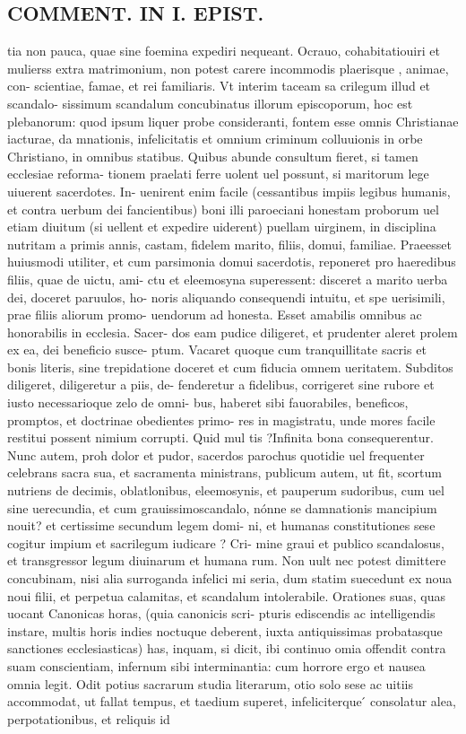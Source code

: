 \documentclass{article}
\begin{document}
\begin{pages}
\section*{COMMENT. IN I. EPIST. }
\marginpar{[ p.492 ]}\pstart tia non pauca, quae sine foemina expediri nequeant. Ocrauo, cohabitatiouiri et mulierss extra matrimonium, non potest carere incommodis plaerisque , animae, con- scientiae, famae, et rei familiaris. Vt interim taceam sa crilegum illud et scandalo- sissimum scandalum concubinatus illorum episcoporum, hoc est plebanorum: quod ipsum liquer probe consideranti, fontem esse omnis Christianae iacturae, da mnationis, infelicitatis et omnium criminum colluuionis in orbe Christiano, in omnibus statibus. Quibus abunde consultum fieret, si tamen ecclesiae reforma- tionem praelati ferre uolent uel possunt, si maritorum lege uiuerent sacerdotes. In- uenirent enim facile (cessantibus impiis legibus humanis, et contra uerbum dei fancientibus) boni illi paroeciani honestam proborum uel etiam diuitum (si uellent et expedire uiderent) puellam uirginem, in disciplina nutritam a primis annis, castam, fidelem marito, filiis, domui, familiae. Praeesset huiusmodi utiliter, et cum parsimonia domui sacerdotis, reponeret pro haeredibus filiis, quae de uictu, ami- ctu et eleemosyna superessent: disceret a marito uerba dei, doceret paruulos, ho- noris aliquando consequendi intuitu, et spe uerisimili, prae filiis aliorum promo- uendorum ad honesta. Esset amabilis omnibus ac honorabilis in ecclesia. Sacer- dos eam pudice diligeret, et prudenter aleret prolem ex ea, dei beneficio susce- ptum. Vacaret quoque cum tranquillitate sacris et bonis literis, sine trepidatione doceret et cum fiducia omnem ueritatem. Subditos diligeret, diligeretur a piis, de- fenderetur a fidelibus, corrigeret sine rubore et iusto necessarioque zelo de omni- bus, haberet sibi fauorabiles, beneficos, promptos, et doctrinae obedientes primo- res in magistratu, unde mores facile restitui possent nimium corrupti. Quid mul tis ?Infinita bona consequerentur. Nunc autem, proh dolor et pudor, sacerdos parochus quotidie uel frequenter celebrans sacra sua, et sacramenta ministrans, publicum autem, ut fit, scortum nutriens de decimis, oblatlonibus, eleemosynis, et pauperum sudoribus, cum uel sine uerecundia, et cum grauissimoscandalo, nónne se damnationis mancipium nouit? et certissime secundum legem domi- ni, et humanas constitutiones sese cogitur impium et sacrilegum iudicare ? Cri- mine graui et publico scandalosus, et transgressor legum diuinarum et humana rum. Non uult nec potest dimittere concubinam, nisi alia surroganda infelici mi seria, dum statim suecedunt ex noua noui filii, et perpetua calamitas, et scandalum intolerabile. Orationes suas, quas uocant Canonicas horas, (quia canonicis scri- pturis ediscendis ac intelligendis instare, multis horis indies noctuque deberent, iuxta antiquissimas probatasque sanctiones ecclesiasticas) has, inquam, si dicit, ibi continuo omia offendit contra suam conscientiam, infernum sibi interminantia: cum horrore ergo et nausea omnia legit. Odit potius sacrarum studia literarum, otio solo sese ac uitiis accommodat, ut fallat tempus, et taedium superet, infeliciterque ́ consolatur alea, perpotationibus, et reliquis id 
\end{pages}
\end{document}
